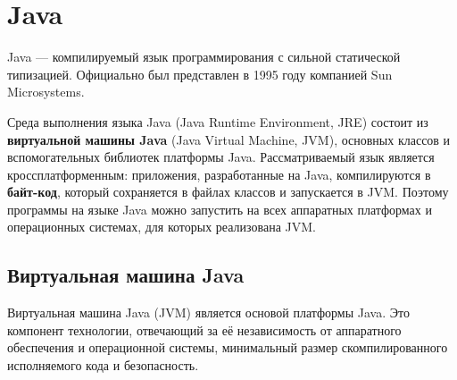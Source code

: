 %
%
%
%
%
%
%
%
%
%
%
%





\section{Java}

Java \cite{java_gc_basics} --- компилируемый язык программирования с сильной статической типизацией. Официально был представлен в 1995 году компанией Sun Microsystems. 

Среда выполнения языка Java (Java Runtime Environment, JRE) состоит из \textbf{виртуальной машины Java} (Java Virtual Machine, JVM), основных классов и вспомогательных библиотек платформы Java. Рассматриваемый язык является кроссплатформенным: приложения, разработанные на Java, компилируются в \textbf{байт-код}, который сохраняется в файлах классов и запускается в JVM. Поэтому программы на языке Java можно запустить на всех аппаратных платформах и операционных системах, для которых реализована JVM. \cite{java_gc_basics}



\subsection{Виртуальная машина Java}

Виртуальная машина Java (JVM) является основой платформы Java. Это компонент технологии, отвечающий за её независимость от аппаратного обеспечения и операционной системы, минимальный размер скомпилированного исполняемого кода и безопасность. \cite{java_21_spec}

